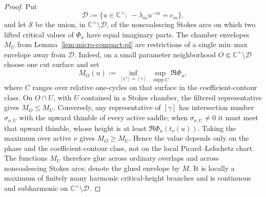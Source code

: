 \documentclass[reqno]{article}
\theoremstyle{definition}
\theoremstyle{remark}
\theoremstyle{plain}
\newcommand{\C}{\mathbb C}
\begin{document}
\begin{proof}
Put
\[
\mathcal D:=\{u\in\C^\times:\ -\lambda_m u^{-m}=c_m\},
\]
and let $\mathcal S$ be the union, in $\C^\times\setminus\mathcal D$, of the noncoalescing Stokes arcs on which two lifted critical values of $\Phi_u$ have equal imaginary parts. The chamber envelopes $M_U$ from Lemma~\ref{lem:micro-compact-pl} are restrictions of a single min--max envelope away from $\mathcal D$. Indeed, on a small parameter neighborhood $O\Subset\C^\times\setminus\mathcal D$ choose one cut surface and set
\[
M_O(u):=\inf_{[C]=[\gamma]}\ \sup_{\operatorname{supp}C}\Re\Phi_u ,
\]
where $C$ ranges over relative one-cycles on that surface in the coefficient-contour class. On $O\cap U$, with $U$ contained in a Stokes chamber, the filtered representative gives $M_O\le M_U$. Conversely, any representative of $[\gamma]$ has intersection number $\sigma_{\nu,U}$ with the upward thimble of every active saddle; when $\sigma_{\nu,U}\ne0$ it must meet that upward thimble, whose height is at least $\Re\Phi_u(t_\nu(u))$. Taking the maximum over active $\nu$ gives $M_O\ge M_U$. Hence the value depends only on the phase and the coefficient-contour class, not on the local Picard--Lefschetz chart. The functions $M_U$ therefore glue across ordinary overlaps and across noncoalescing Stokes arcs; denote the glued envelope by $M$. It is locally a maximum of finitely many harmonic critical-height branches and is continuous and subharmonic on $\C^\times\setminus\mathcal D$.


\end{proof}
\end{document}
